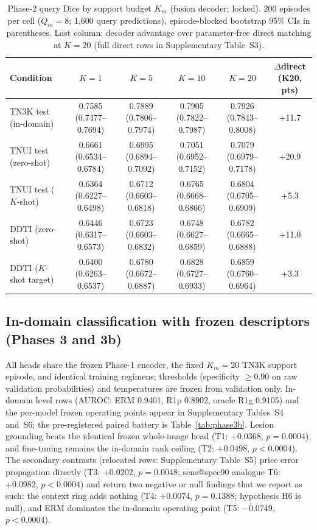 \documentclass[jimh,article,submit,moreauthors,pdftex]{Definitions/tsp}
\newcommand{\lgShrink}[1]{{\scriptsize #1}}
\begin{document}
\begin{table}[!ht]
\centering\scriptsize
\caption{Phase-2 query Dice by support budget $K_m$ (fusion decoder; locked).
200 episodes per cell ($Q_m{=}8$; 1,600 query predictions), episode-blocked
bootstrap 95\% CIs in parentheses. Last column: decoder advantage over
parameter-free direct matching at $K{=}20$ (full direct rows in
Supplementary Table~S3).}
\label{tab:phase2}
\lgShrink{%
\begin{tabular}{lccccc}
\toprule
Condition & $K{=}1$ & $K{=}5$ & $K{=}10$ & $K{=}20$ & $\Delta$direct (K20, pts) \\
\midrule
TN3K test (in-domain)  & 0.7585 (0.7477--0.7694) & 0.7889 (0.7806--0.7974) & 0.7905 (0.7822--0.7987) & 0.7926 (0.7843--0.8008) & +11.7 \\
TNUI test (zero-shot)  & 0.6661 (0.6534--0.6784) & 0.6995 (0.6894--0.7092) & 0.7051 (0.6952--0.7152) & 0.7079 (0.6979--0.7178) & +20.9 \\
TNUI test ($K$-shot)   & 0.6364 (0.6227--0.6498) & 0.6712 (0.6603--0.6818) & 0.6765 (0.6668--0.6866) & 0.6804 (0.6705--0.6909) & +5.3 \\
DDTI (zero-shot)       & 0.6446 (0.6317--0.6573) & 0.6723 (0.6603--0.6832) & 0.6748 (0.6627--0.6859) & 0.6782 (0.6665--0.6888) & +11.0 \\
DDTI ($K$-shot target) & 0.6400 (0.6263--0.6537) & 0.6780 (0.6672--0.6887) & 0.6828 (0.6727--0.6933) & 0.6859 (0.6760--0.6964) & +3.3 \\
\bottomrule
\end{tabular}%
}
\end{table}

\subsection{In-domain classification with frozen descriptors (Phases 3 and 3b)}
\label{subsec:res_phase3}

All heads share the frozen Phase-1 encoder, the fixed $K_m{=}20$ TN3K
support episode, and identical training regimens; thresholds
(specificity $\geq 0.90$ on raw validation probabilities) and
temperatures are frozen from validation only. In-domain level rows
(AUROC: ERM 0.9401, R1p 0.8902, oracle R1g 0.9105) and the per-model
frozen operating points appear in Supplementary Tables~S4 and~S6; the
pre-registered paired battery is Table~\ref{tab:phase3b}. Lesion
grounding beats the identical frozen whole-image head (T1: $+0.0368$,
$p{=}0.0004$), and fine-tuning remains the in-domain rank ceiling (T2:
$+0.0498$, $p{<}0.0004$). The secondary contrasts (relocated rows:
Supplementary Table~S5) price error propagation directly (T3:
$+0.0202$, $p{=}0.0048$; sens@spec90 analogue T6: $+0.0982$,
$p{<}0.0004$) and return two negative or null findings that we report
as such: the context ring adds nothing (T4: $+0.0074$, $p{=}0.1388$;
hypothesis H6 is null), and ERM dominates the in-domain operating
point (T5: $-0.0749$, $p{<}0.0004$).
\end{document}
